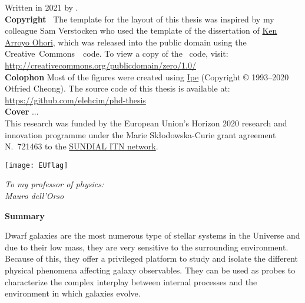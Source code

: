 \clearpage
\thispagestyle{empty}
\null%
\label{thesis:colophon}
\vfill
{}
\noindent Written in 2021 by {\makeatletter{\@author}\makeatother}.\\
\textbf{Copyright}~\cczero{} The template for the layout of this thesis was inspired by my colleague Sam Verstocken who used the template of the dissertation of \href{ken.mx}{Ken Arroyo Ohori},
which was released into the public domain using the Creative~Commons~\cczero{}~code.
To view a copy of the \cczero{}~code, visit:\\\url{http://creativecommons.org/publicdomain/zero/1.0/}\\
\textbf{Colophon}
Most of the figures were created using \href{http://ipe.otfried.org/}{Ipe} (Copyright © 1993–2020 Otfried Cheong).
The source code of this thesis is available at: \\
\url{https://github.com/elehcim/phd-thesis}\\
\textbf{Cover}
...\\[2ex]
This research was funded by the European Union's Horizon 2020 research and innovation programme under the Marie Sk\l odowska-Curie
grant agreement N.~721463 to the \href{www.astro.rug.nl/~sundial}{SUNDIAL ITN network}.
\begin{figure*}[bh!]
  \centering
  \texttt{[image: EUflag]}
\end{figure*}

\clearpage
\thispagestyle{empty}
\null%
\vfill
\begin{flushright}
  \textit{To my professor of physics:\\
      Mauro dell'Orso\\
      }
\end{flushright}
\vfill

\clearpage
\thispagestyle{empty}
\null%
\label{thesis:Summary}
\begin{center}
  {\Large \textbf{Summary}}\\
\end{center}

Dwarf galaxies are the most numerous type of stellar systems in the Universe and due to their low mass, they are very sensitive to the surrounding environment.
Because of this, they offer a privileged platform to study and isolate the different physical phenomena affecting galaxy observables.
They can be used as probes to characterize the complex interplay between internal processes and the environment in which galaxies evolve.

